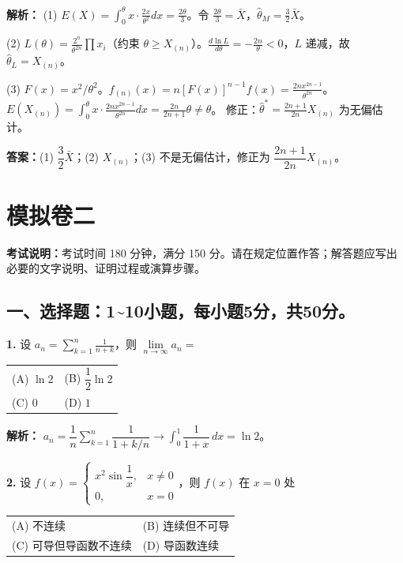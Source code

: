 \ifshowsolutions\par\noindent\textbf{解析：} (1) $E(X)=\int_{0}^{\theta}x\cdot\frac{2x}{\theta^2}dx = \frac{2\theta}{3}$。令 $\frac{2\theta}{3}=\bar{X}$，$\hat{\theta}_M=\frac{3}{2}\bar{X}$。

(2) $L(\theta)=\frac{2^n}{\theta^{2n}}\prod x_i$（约束 $\theta\geqslant X_{(n)}$）。$\frac{d\ln L}{d\theta}=-\frac{2n}{\theta}<0$，$L$ 递减，故 $\hat{\theta}_L=X_{(n)}$。

(3) $F(x)=x^2/\theta^2$。$f_{(n)}(x)=n[F(x)]^{n-1}f(x)=\frac{2n x^{2n-1}}{\theta^{2n}}$。
$E(X_{(n)})=\int_{0}^{\theta}x\cdot\frac{2n x^{2n-1}}{\theta^{2n}}dx = \frac{2n}{2n+1}\theta \neq \theta$。
修正：$\hat{\theta}^*=\frac{2n+1}{2n}X_{(n)}$ 为无偏估计。
\par\noindent\textbf{答案：}(1) $\dfrac{3}{2}\bar{X}$；(2) $X_{(n)}$；(3) 不是无偏估计，修正为 $\dfrac{2n+1}{2n}X_{(n)}$。\else \answerarea[8] \fi


\newpage
\section{模拟卷二}

\noindent\textbf{考试说明：}考试时间 180 分钟，满分 150 分。请在规定位置作答；解答题应写出必要的文字说明、证明过程或演算步骤。

\subsection*{一、选择题：1\textasciitilde10小题，每小题5分，共50分。}

\textbf{1.} 设 $a_n = \displaystyle\sum_{k=1}^{n} \frac{1}{n+k}$，则 $\lim\limits_{n \to \infty} a_n =$
\begin{center}
\begin{tabular}{ll}
(A) $\ln 2$ & (B) $\dfrac{1}{2}\ln 2$ \\[6pt]
(C) $0$ & (D) $1$
\end{tabular}
\end{center}

\ifshowsolutions\par\noindent\textbf{解析：} $a_n = \dfrac{1}{n}\displaystyle\sum_{k=1}^{n} \dfrac{1}{1+k/n} \to \displaystyle\int_{0}^{1} \dfrac{1}{1+x}\,dx = \ln 2$。\else \answerarea \fi

\vspace{8pt}

\textbf{2.} 设 $f(x) = \begin{cases} x^2 \sin\dfrac{1}{x}, & x \neq 0 \\ 0, & x=0 \end{cases}$，则 $f(x)$ 在 $x=0$ 处
\begin{center}
\begin{tabular}{ll}
(A) 不连续 & (B) 连续但不可导 \\[4pt]
(C) 可导但导函数不连续 & (D) 导函数连续
\end{tabular}
\end{center}

